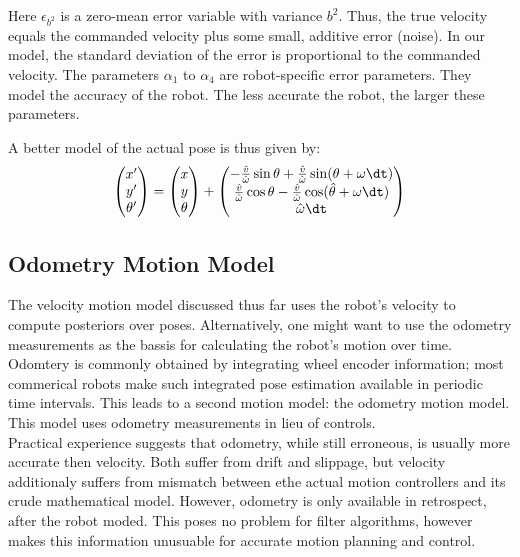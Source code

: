 Here $\epsilon_{b^2}$ is a zero-mean error variable with variance $b^2$. Thus, the true velocity equals the commanded velocity plus some small, additive error (noise).
In our model, the standard deviation of the error is proportional to the commanded velocity. The parameters $\alpha_1$ to $\alpha_4$ are robot-specific error parameters.
They model the accuracy of the robot. The less accurate the robot, the larger these parameters.

A better model of the actual pose is thus given by:
\begin{equation}
  \begin{pmatrix}x' \\ y' \\ \theta' \end{pmatrix} = \begin{pmatrix}x \\ y \\ \theta \end{pmatrix} + \begin{pmatrix}-\frac{\hat{v}}{\hat{\omega}}\sin \theta + \frac{\hat{v}}{\hat{\omega}}\sin (\theta + \omega \dt) \\
  \frac{\hat{v}}{\hat{\omega}}\cos \theta- \frac{\hat{v}}{\hat{\omega}}\cos (\hat\theta+\omega \dt )\\ \hat{\omega} \dt \end{pmatrix}
  \label{eq:noisy motion model}
\end{equation}


\newpage


\subsection{Odometry Motion Model}

The velocity motion model discussed thus far uses the robot's velocity to compute posteriors over poses. Alternatively, one might want to use the odometry measurements as the bassis for calculating the robot's motion over time.
Odomtery is commonly obtained by integrating wheel encoder information; most commerical robots make such integrated pose estimation available in periodic time intervals.
This leads to a second motion model: the odometry motion model. This model uses odometry measurements in lieu of controls.\\

Practical experience suggests that odometry, while still erroneous, is usually more accurate then velocity.
Both suffer from drift and slippage, but velocity additionaly suffers from mismatch between ethe actual motion controllers and its crude mathematical model.
However, odometry is only available in retrospect, after the robot moded. This poses no problem for filter algorithms, however makes this information unusuable for accurate motion planning and control.

